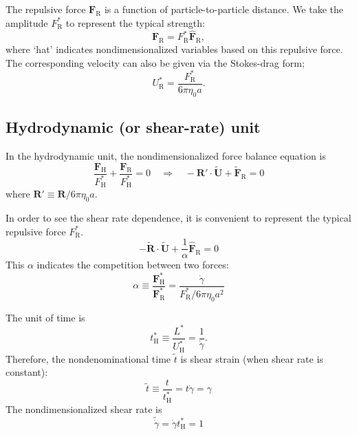 \documentclass[fontsize=11pt]{scrartcl}
\begin{document}
The repulsive force $\bm{F}_{\mathrm{R}}$ 
is a function of particle-to-particle distance.
%
We take the amplitude $F_{\mathrm{R}}^{\ast}$
to represent the typical strength:
%
\begin{equation}
 \bm{F}_{\mathrm{R}} =  F_{\mathrm{R}}^{\ast}
\hat{\bm{F}}_{\mathrm{R}},
\end{equation}
where `hat' indicates nondimensionalized variables
based on this repulsive force.
%
The corresponding velocity can also be
given via the Stokes-drag form;
\begin{equation}
 U^{\ast}_{\mathrm{R}}
  = \frac{F_{\mathrm{R}}^{\ast}}{6\pi\eta_0 a}.
\end{equation}
%

\subsection*{Hydrodynamic (or shear-rate) unit}

In the hydrodynamic unit, the nondimensionalized
force balance equation is
\begin{equation}
 \frac{\bm{F}_{\mathrm{H}}}{F^{\ast}_{\mathrm{H}}}
  +
  \frac{\bm{F}_{\mathrm{R}}}{F^{\ast}_{\mathrm{H}}}  = 0
  \quad
  \Longrightarrow 
    \quad
 - \bm{R}' \cdot \tilde{\bm{U}} + \tilde{\bm{F}}_{\mathrm{R}} = 0
\end{equation}
where
$\bm{R}' \equiv \bm{R} / 6 \pi \eta_0 a $.

In order to see the shear rate dependence,
it is convenient to represent
the typical repulsive force $F_{\mathrm{R}}^{\ast}$.
%
\begin{equation}
 - \tilde{\bm{R}} \cdot \tilde{\bm{U}} +
\frac{1}{\alpha}  \hat{\bm{F}}_{\mathrm{R}} = 0
\end{equation}
%
This $\alpha$ indicates the competition between two forces:
\begin{equation}
 \alpha \equiv
\frac{\bm{F}_{\mathrm{H}}^{\ast}}{\bm{F}_{\mathrm{R}}^{\ast}}
=
  \frac{\dot{\gamma}}{F_{\mathrm{R}}^{\ast}/6\pi\eta_0 a^2}\label{102734_31May15}
\end{equation}


The unit of time is
\begin{equation}
 t_{\mathrm{H}}^{\ast} \equiv \frac{L^{\ast}}{U_{\mathrm{H}}^{\ast}}
  = \frac{1}{\dot{\gamma}}.
\end{equation}
Therefore, the nondenominational time $\tilde{t}$
is shear strain (when shear rate is constant):
\begin{equation} 
 \tilde{t} \equiv \frac{t}{t_{\mathrm{H}}^{\ast}} = t \dot{\gamma}
   = \gamma
\end{equation}
%
The nondimensionalized shear rate is
\begin{equation}
 \tilde{\dot{\gamma}}
  =
  \dot{\gamma} t_{\mathrm{H}}^{\ast} = 1
\end{equation}
\end{document}
